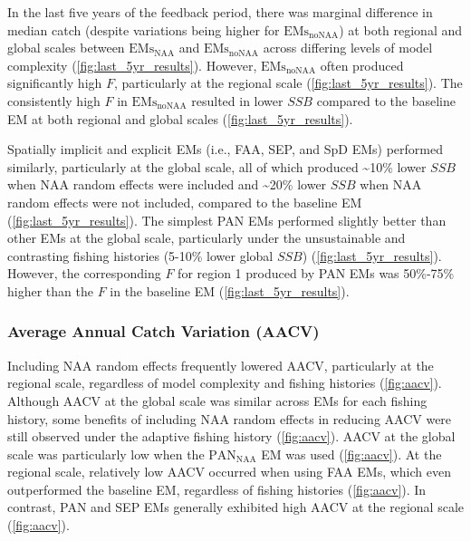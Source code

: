 \documentclass[
  12pt,
]{article}
\begin{document}
In the last five years of the feedback period, there was marginal
difference in median catch (despite variations being higher for
\(\text{EMs}_{\scriptscriptstyle \text{noNAA}}\)) at both regional and
global scales between \(\text{EMs}_{\scriptscriptstyle \text{NAA}}\) and
\(\text{EMs}_{\scriptscriptstyle \text{noNAA}}\) across differing levels
of model complexity (\autoref{fig:last_5yr_results}). However,
\(\text{EMs}_{\scriptscriptstyle \text{noNAA}}\) often produced
significantly high \(F\), particularly at the regional scale
(\autoref{fig:last_5yr_results}). The consistently high \(F\) in
\(\text{EMs}_{\scriptscriptstyle \text{noNAA}}\) resulted in lower
\(SSB\) compared to the baseline EM at both regional and global scales
(\autoref{fig:last_5yr_results}).

Spatially implicit and explicit EMs (i.e., FAA, SEP, and SpD EMs)
performed similarly, particularly at the global scale, all of which
produced \textasciitilde10\% lower \(SSB\) when NAA random effects were
included and \textasciitilde20\% lower \(SSB\) when NAA random effects
were not included, compared to the baseline EM
(\autoref{fig:last_5yr_results}). The simplest PAN EMs performed
slightly better than other EMs at the global scale, particularly under
the unsustainable and contrasting fishing histories (5-10\% lower global
\(SSB\)) (\autoref{fig:last_5yr_results}). However, the corresponding
\(F\) for region 1 produced by PAN EMs was 50\%-75\% higher than the
\(F\) in the baseline EM (\autoref{fig:last_5yr_results}).

\hypertarget{average-annual-catch-variation-aacv}{%
\subsubsection{Average Annual Catch Variation
(AACV)}\label{average-annual-catch-variation-aacv}}

Including NAA random effects frequently lowered AACV, particularly at
the regional scale, regardless of model complexity and fishing histories
(\autoref{fig:aacv}). Although AACV at the global scale was similar
across EMs for each fishing history, some benefits of including NAA
random effects in reducing AACV were still observed under the adaptive
fishing history (\autoref{fig:aacv}). AACV at the global scale was
particularly low when the \(\text{PAN}_{\scriptscriptstyle \text{NAA}}\)
EM was used (\autoref{fig:aacv}). At the regional scale, relatively low
AACV occurred when using FAA EMs, which even outperformed the baseline
EM, regardless of fishing histories (\autoref{fig:aacv}). In contrast,
PAN and SEP EMs generally exhibited high AACV at the regional scale
(\autoref{fig:aacv}).
\end{document}
